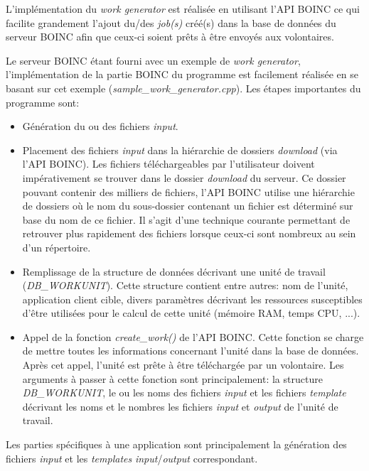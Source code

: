 \documentclass[a4paper, 12pt]{report}
\begin{document}
L'implémentation du \textit{work generator} est réalisée en utilisant l'API \textsc{BOINC} ce qui facilite grandement l'ajout du/des \textit{job(s)} créé(s) dans la base de données du serveur \textsc{BOINC} afin que ceux-ci soient prêts à être envoyés aux volontaires.

Le serveur \textsc{BOINC} étant fourni avec un exemple de \textit{work generator}, l'implémentation de la partie \textsc{BOINC} du programme est facilement réalisée en se basant sur cet exemple (\textit{sample\_work\_generator.cpp}). Les étapes importantes du programme sont:
\begin{itemize}
\item Génération du ou des fichiers \textit{input}.
\item Placement des fichiers \textit{input} dans la hiérarchie de dossiers \textit{download} (via l'API \textsc{BOINC}). Les fichiers téléchargeables par l'utilisateur doivent impérativement se trouver dans le dossier \textit{download} du serveur. Ce dossier pouvant contenir des milliers de fichiers, l'API \textsc{BOINC} utilise une hiérarchie de dossiers où le nom du sous-dossier contenant un fichier est déterminé sur base du nom de ce fichier. Il s'agit d'une technique courante permettant de retrouver plus rapidement des fichiers lorsque ceux-ci sont nombreux au sein d'un répertoire.
\item Remplissage de la structure de données décrivant une unité de travail \newline(\textit{DB\_WORKUNIT}). Cette structure contient entre autres: nom de l'unité, application client cible, divers paramètres décrivant les ressources susceptibles d'être utilisées pour le calcul de cette unité (mémoire RAM, temps CPU, ...).
\item Appel de la fonction \textit{create\_work()} de l'API \textsc{BOINC}. Cette fonction se charge de mettre toutes les informations concernant l'unité dans la base de données. Après cet appel, l'unité est prête à être téléchargée par un volontaire. Les arguments à passer à cette fonction sont principalement: la structure \textit{DB\_WORKUNIT}, le ou les noms des fichiers \textit{input} et les fichiers \textit{template} décrivant les noms et le nombres les fichiers \textit{input} et \textit{output} de l'unité de travail. %
\end{itemize}

Les parties spécifiques à une application sont principalement la génération des fichiers \textit{input} et les \textit{templates} \textit{input}/\textit{output} correspondant.
\end{document}
